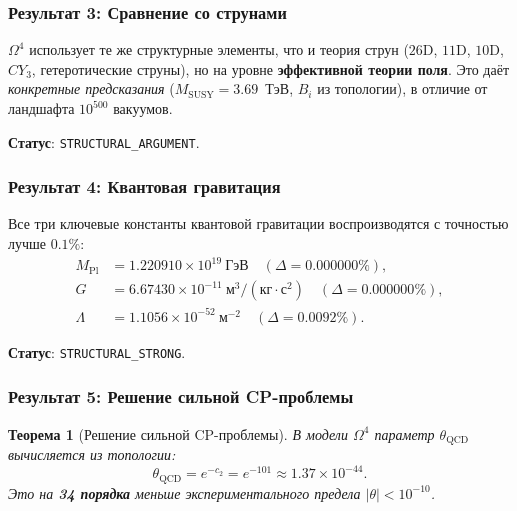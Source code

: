 \documentclass[11pt,a4paper]{article}
\newcommand{\CY}{\ensuremath{CY_3}}
\newcommand{\Om}{\ensuremath{\Omega^4}}
\newtheorem{theorem}{Теорема}[section]
\theoremstyle{definition}
\begin{document}
\subsubsection{Результат 3: Сравнение со струнами}

$\Om$ использует те же структурные элементы, что и теория
струн ($26$D, $11$D, $10$D, $\CY$, гетеротические струны),
но на уровне \textbf{эффективной теории поля}. Это даёт
\emph{конкретные предсказания} ($M_{\text{SUSY}} = 3.69$~ТэВ,
$B_i$ из топологии), в отличие от ландшафта $10^{500}$ вакуумов.

\medskip\noindent
\textbf{Статус}: \texttt{STRUCTURAL\_ARGUMENT}.

\subsubsection{Результат 4: Квантовая гравитация}

Все три ключевые константы квантовой гравитации
воспроизводятся с точностью лучше $0.1\%$:
\begin{equation}
    \boxed{
    \begin{aligned}
        M_{\text{Pl}} &= 1.220910 \times 10^{19}~\text{ГэВ}
        \quad (\Delta = 0.000000\%), \\
        G &= 6.67430 \times 10^{-11}~\text{м}^3/(\text{кг} \cdot \text{с}^2)
        \quad (\Delta = 0.000000\%), \\
        \Lambda &= 1.1056 \times 10^{-52}~\text{м}^{-2}
        \quad (\Delta = 0.0092\%).
    \end{aligned}}
\end{equation}

\medskip\noindent
\textbf{Статус}: \texttt{STRUCTURAL\_STRONG}.

\subsubsection{Результат 5: Решение сильной CP-проблемы}

\begin{theorem}[Решение сильной CP-проблемы]
\label{thm:conclusion-strong-cp}
В модели $\Om$ параметр $\theta_{\text{QCD}}$ вычисляется из топологии:
\begin{equation}
    \boxed{
    \theta_{\text{QCD}} = e^{-c_2} = e^{-101} \approx 1.37 \times 10^{-44}.
    }
    \label{eq:conclusion-theta}
\end{equation}
Это на \textbf{34 порядка} меньше экспериментального предела
$|\theta| < 10^{-10}$.
\end{theorem}
\end{document}
